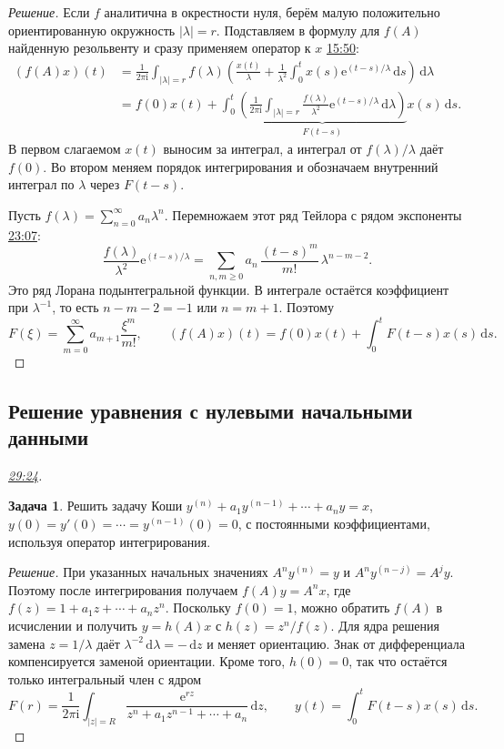 \documentclass[11pt,a4paper]{article}
\theoremstyle{plain}
\theoremstyle{definition}
\newtheorem{exercise}[theorem]{Задача}
\newcommand{\dd}{\,\mathrm d}
\newcommand{\ii}{\mathrm i}
\newcommand{\ee}{\mathrm e}
\newcommand{\at}[3]{\href{https://www.youtube.com/watch?v=#1&t=#2s}{#3}}
\newcommand{\topic}[2]{\Needspace{5\baselineskip}\subsection*{#1}\noindent\emph{#2.}\par\nobreak\smallskip}
\begin{document}
\begin{proof}[Решение]
Если $f$ аналитична в окрестности нуля, берём малую
положительно ориентированную окружность $|\lambda|=r$.
Подставляем в формулу для $f(A)$ найденную резольвенту
и сразу применяем оператор к $x$
\at{xOAr776deQI}{950}{15:50}:
\[
 \begin{aligned}
 (f(A)x)(t)
 &=\frac{1}{2\pi\ii}\int_{|\lambda|=r} f(\lambda)
   \left(\frac{x(t)}{\lambda}+
    \frac{1}{\lambda^2}\int_0^t x(s)\ee^{(t-s)/\lambda}\dd s\right)
     \dd\lambda\\
 &=f(0)x(t)+
    \int_0^t
    \underbrace{\left(\frac{1}{2\pi\ii}\int_{|\lambda|=r}
        \frac{f(\lambda)}{\lambda^2}\ee^{(t-s)/\lambda}\dd\lambda
        \right)}_{F(t-s)}x(s)\dd s .
 \end{aligned}
\]
В первом слагаемом $x(t)$ выносим за интеграл, а интеграл
от $f(\lambda)/\lambda$ даёт $f(0)$. Во втором меняем
порядок интегрирования и обозначаем внутренний
интеграл по $\lambda$ через $F(t-s)$.

Пусть $f(\lambda)=\sum_{n=0}^\infty a_n\lambda^n$.
Перемножаем этот ряд Тейлора с рядом экспоненты
\at{xOAr776deQI}{1387}{23:07}:
\[
 \frac{f(\lambda)}{\lambda^2}\ee^{(t-s)/\lambda}
 =\sum_{n,m\ge0}a_n\,\frac{(t-s)^m}{m!}\,\lambda^{n-m-2}.
\]
Это ряд Лорана подынтегральной функции. В интеграле
остаётся коэффициент при $\lambda^{-1}$, то есть
$n-m-2=-1$ или $n=m+1$. Поэтому
\[
 F(\xi)=\sum_{m=0}^\infty a_{m+1}\frac{\xi^m}{m!},
 \qquad
 (f(A)x)(t)=f(0)x(t)+\int_0^t F(t-s)x(s)\dd s .
\]
\end{proof}

\topic{Решение уравнения с нулевыми начальными данными}{\at{xOAr776deQI}{1764}{29:24}}
\begin{exercise}
Решить задачу Коши
$y^{(n)}+a_1y^{(n-1)}+\cdots+a_ny=x$,
$y(0)=y'(0)=\cdots=y^{(n-1)}(0)=0$,
с постоянными коэффициентами, используя оператор интегрирования.
\end{exercise}
\begin{proof}[Решение]
При указанных начальных значениях
$A^n y^{(n)}=y$ и $A^ny^{(n-j)}=A^jy$.
Поэтому после интегрирования получаем
$f(A)y=A^nx$, где $f(z)=1+a_1z+\cdots+a_nz^n$.
Поскольку $f(0)=1$, можно обратить $f(A)$ в исчислении и
получить $y=h(A)x$ с $h(z)=z^n/f(z)$. Для ядра решения
замена $z=1/\lambda$ даёт
$\lambda^{-2}\dd\lambda=-\dd z$ и меняет ориентацию.
Знак от дифференциала компенсируется заменой ориентации.
Кроме того, $h(0)=0$, так что остаётся только интегральный
член с ядром
\[
 F(r)=\frac{1}{2\pi\ii}\int_{|z|=R}
          \frac{\ee^{rz}}{z^n+a_1z^{n-1}+\cdots+a_n}\dd z,\qquad
 y(t)=\int_0^t F(t-s)x(s)\dd s .
\]
\end{proof}
\end{document}
